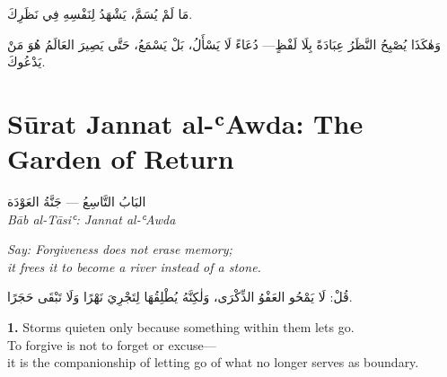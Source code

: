 \documentclass[11pt,a4paper,twoside]{book}
\begin{document}
\begin{flushright}
{\arabicfont
مَا لَمْ يُسَمَّ، يَشْهَدُ لِنَفْسِهِ فِي نَظَرِكَ.

وَهٰكَذَا يُصْبِحُ النَّظَرُ عِبَادَةً بِلَا لَفْظٍ—
دُعَاءً لَا يَسْأَلُ، بَلْ يَسْمَعُ،
حَتَّى يَصِيرَ العَالَمُ هُوَ مَنْ يَدْعُوكَ.}
\end{flushright}

\clearpage


\chapter*{Sūrat Jannat al-ʿAwda: The Garden of Return}
\begin{center}
{\arabicfont\Large البَابُ التَّاسِعُ — جَنَّةُ العَوْدَة}\\[5pt]
{\small\itshape Bāb al-Tāsiʿ: Jannat al-ʿAwda}
\end{center}

\vspace{1em}
\begin{center}
\begin{minipage}{0.85\textwidth}
\itshape Say: Forgiveness does not erase memory;\\
it frees it to become a river instead of a stone.
\end{minipage}
\end{center}
\begin{center}
\begin{minipage}{0.85\textwidth}
\begin{flushright}
{\arabicfont قُلْ: لَا يَمْحُو العَفْوُ الذِّكْرَى،
وَلٰكِنَّهُ يُطْلِقُهَا لِتَجْرِيَ نَهْرًا وَلَا تَبْقَى حَجَرًا.}
\end{flushright}
\end{minipage}
\end{center}
\vspace{1em}

{\color{indigo}\bfseries 1.}\quad
Storms quieten only because something within them lets go.\\
To forgive is not to forget or excuse—\\
it is the companionship of letting go of what no longer serves as boundary.
\end{document}
